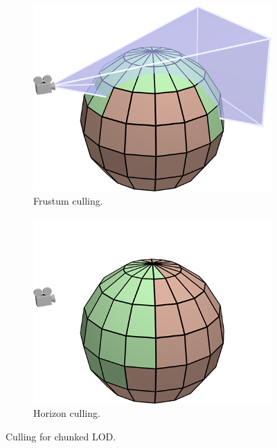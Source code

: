 \begin{figure}[htbp]
    \centering
    \begin{subfigure}[bt]{0.35\textwidth}
        \includegraphics[width=\textwidth]{figures/chunkedlod/culling_frustum.png}
        \caption{Frustum culling.}
        \label{fig:culling1}
    \end{subfigure}
    \quad \quad \quad
    \begin{subfigure}[bt]{0.35\textwidth}
        \includegraphics[width=\textwidth]{figures/chunkedlod/culling_horizon.png}
        \caption{Horizon culling.}
        \label{fig:culling2}
    \end{subfigure}
    \caption{Culling for chunked LOD.}
    \label{fig:cullingchunkedlod}
\end{figure}

